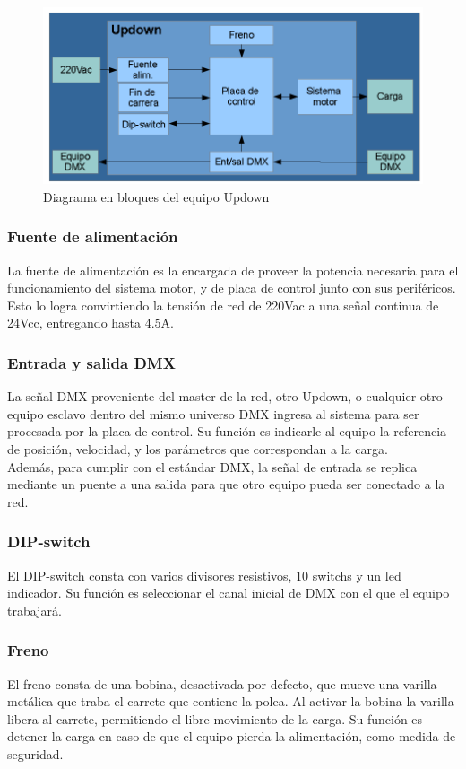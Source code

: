 \begin{figure}[!ht]
	\centering
	\includegraphics[width=15cm,scale=1]{resources/1_10-diagramaBasicoUpdown.png}
	\caption{Diagrama en bloques del equipo Updown}
	\label{fig:\thefigure}
\end{figure}

\subsubsection{Fuente de alimentación}
La fuente de alimentación es la encargada de proveer la potencia necesaria para el funcionamiento del sistema motor, y de placa de control junto con sus periféricos. Esto lo logra convirtiendo la tensión de red de 220Vac a una señal continua de 24Vcc, entregando hasta 4.5A.

\subsubsection{Entrada y salida DMX}
La señal DMX proveniente del master de la red, otro Updown, o cualquier otro equipo esclavo dentro del mismo universo DMX ingresa al sistema para ser procesada por la placa de control. Su función es indicarle al equipo la referencia de posición, velocidad, y los parámetros que correspondan a la carga.\\
Además, para cumplir con el estándar DMX, la señal de entrada se replica mediante un puente a una salida para que otro equipo pueda ser conectado a la red.

\subsubsection{DIP-switch}
El DIP-switch consta con varios divisores resistivos, 10 switchs y un led indicador. Su función es seleccionar el canal inicial de DMX con el que el equipo trabajará.

\subsubsection{Freno}
El freno consta de una bobina, desactivada por defecto, que mueve una varilla metálica que traba el carrete que contiene la polea. Al activar la bobina la varilla libera al carrete, permitiendo el libre movimiento de la carga. Su función es detener la carga en caso de que el equipo pierda la alimentación, como medida de seguridad.

